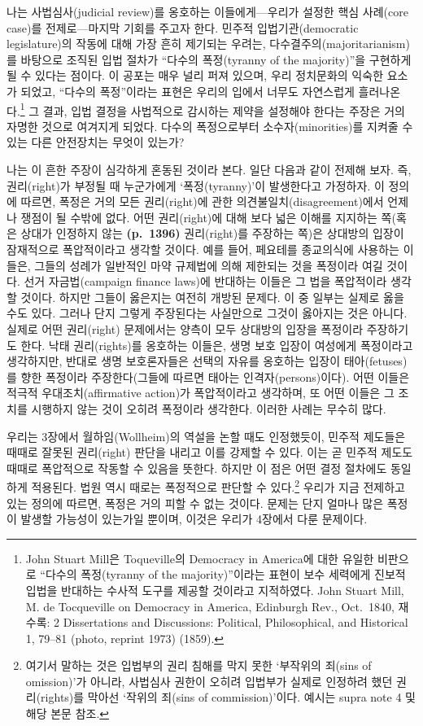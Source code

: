 \documentclass[a4paper,12pt,oneside]{article}  %
\begin{document}
나는 사법심사(judicial review)를 옹호하는 이들에게---우리가 설정한 핵심
사례(core case)를 전제로---마지막 기회를 주고자 한다. 민주적
입법기관(democratic legislature)의 작동에 대해 가장 흔히 제기되는
우려는, 다수결주의(majoritarianism)를 바탕으로 조직된 입법 절차가
``다수의 폭정(tyranny of the majority)''을 구현하게 될 수 있다는 점이다.
이 공포는 매우 널리 퍼져 있으며, 우리 정치문화의 익숙한 요소가 되었고,
``다수의 폭정''이라는 표현은 우리의 입에서 너무도 자연스럽게
흘러나온다.\footnote{John Stuart Mill은 Toqueville의 Democracy in
  America에 대한 유일한 비판으로 ``다수의 폭정(tyranny of the
  majority)''이라는 표현이 보수 세력에게 진보적 입법을 반대하는 수사적
  도구를 제공할 것이라고 지적하였다. John Stuart Mill, M. de Tocqueville
  on Democracy in America, Edinburgh Rev., Oct.~1840, 재수록: 2
  Dissertations and Discussions: Political, Philosophical, and
  Historical 1, 79--81 (photo, reprint 1973) (1859).} 그 결과, 입법
결정을 사법적으로 감시하는 제약을 설정해야 한다는 주장은 거의 자명한
것으로 여겨지게 되었다. 다수의 폭정으로부터 소수자(minorities)를 지켜줄
수 있는 다른 안전장치는 무엇이 있는가?

나는 이 흔한 주장이 심각하게 혼동된 것이라 본다. 일단 다음과 같이 전제해
보자. 즉, 권리(right)가 부정될 때 누군가에게 `폭정(tyranny)'이
발생한다고 가정하자. 이 정의에 따르면, 폭정은 거의 모든 권리(right)에
관한 의견불일치(disagreement)에서 언제나 쟁점이 될 수밖에 없다. 어떤
권리(right)에 대해 보다 넓은 이해를 지지하는 쪽(혹은 상대가 인정하지
않는 \textbf{(p.~1396)} 권리(right)를 주장하는 쪽)은 상대방의 입장이
잠재적으로 폭압적이라고 생각할 것이다. 예를 들어, 페요테를 종교의식에
사용하는 이들은, 그들의 성례가 일반적인 마약 규제법에 의해 제한되는 것을
폭정이라 여길 것이다. 선거 자금법(campaign finance laws)에 반대하는
이들은 그 법을 폭압적이라 생각할 것이다. 하지만 그들이 옳은지는 여전히
개방된 문제다. 이 중 일부는 실제로 옳을 수도 있다. 그러나 단지 그렇게
주장된다는 사실만으로 그것이 옳아지는 것은 아니다. 실제로 어떤
권리(right) 문제에서는 양측이 모두 상대방의 입장을 폭정이라 주장하기도
한다. 낙태 권리(rights)를 옹호하는 이들은, 생명 보호 입장이 여성에게
폭정이라고 생각하지만, 반대로 생명 보호론자들은 선택의 자유를 옹호하는
입장이 태아(fetuses)를 향한 폭정이라 주장한다(그들에 따르면 태아는
인격자(persons)이다). 어떤 이들은 적극적 우대조치(affirmative action)가
폭압적이라고 생각하며, 또 어떤 이들은 그 조치를 시행하지 않는 것이
오히려 폭정이라 생각한다. 이러한 사례는 무수히 많다.

우리는 3장에서 월하임(Wollheim)의 역설을 논할 때도 인정했듯이, 민주적
제도들은 때때로 잘못된 권리(right) 판단을 내리고 이를 강제할 수 있다.
이는 곧 민주적 제도도 때때로 폭압적으로 작동할 수 있음을 뜻한다. 하지만
이 점은 어떤 결정 절차에도 동일하게 적용된다. 법원 역시 때로는
폭정적으로 판단할 수 있다.\footnote{여기서 말하는 것은 입법부의 권리
  침해를 막지 못한 `부작위의 죄(sins of omission)'가 아니라, 사법심사
  권한이 오히려 입법부가 실제로 인정하려 했던 권리(rights)를 막아선
  `작위의 죄(sins of commission)'이다. 예시는 supra note 4 및 해당 본문
  참조.} 우리가 지금 전제하고 있는 정의에 따르면, 폭정은 거의 피할 수
없는 것이다. 문제는 단지 얼마나 많은 폭정이 발생할 가능성이 있는가일
뿐이며, 이것은 우리가 4장에서 다룬 문제이다.
\end{document}
